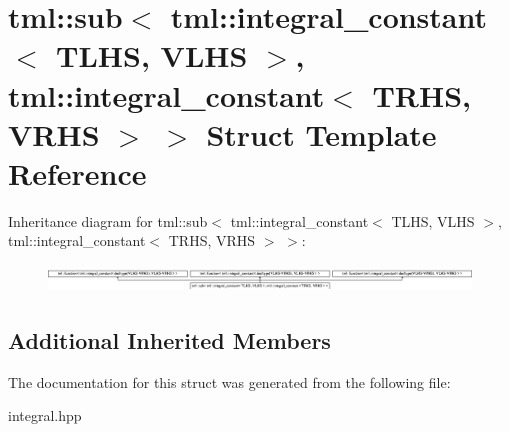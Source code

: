 \hypertarget{structtml_1_1sub_3_01tml_1_1integral__constant_3_01TLHS_00_01VLHS_01_4_00_01tml_1_1integral__cona3ddff076738c3763f61163d0532e147}{\section{tml\+:\+:sub$<$ tml\+:\+:integral\+\_\+constant$<$ T\+L\+H\+S, V\+L\+H\+S $>$, tml\+:\+:integral\+\_\+constant$<$ T\+R\+H\+S, V\+R\+H\+S $>$ $>$ Struct Template Reference}
\label{structtml_1_1sub_3_01tml_1_1integral__constant_3_01TLHS_00_01VLHS_01_4_00_01tml_1_1integral__cona3ddff076738c3763f61163d0532e147}
}
Inheritance diagram for tml\+:\+:sub$<$ tml\+:\+:integral\+\_\+constant$<$ T\+L\+H\+S, V\+L\+H\+S $>$, tml\+:\+:integral\+\_\+constant$<$ T\+R\+H\+S, V\+R\+H\+S $>$ $>$\+:\begin{figure}[H]
\begin{center}
\leavevmode
\includegraphics[height=0.712468cm]{structtml_1_1sub_3_01tml_1_1integral__constant_3_01TLHS_00_01VLHS_01_4_00_01tml_1_1integral__cona3ddff076738c3763f61163d0532e147}
\end{center}
\end{figure}
\subsection*{Additional Inherited Members}


The documentation for this struct was generated from the following file\+:\begin{DoxyCompactItemize}
\item 
integral.\+hpp\end{DoxyCompactItemize}
